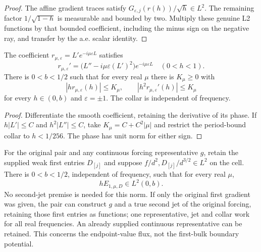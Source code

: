 \begin{proof}
\leanok
The affine gradient traces satisfy $G_{\varepsilon,j}(r(h))/\sqrt h\in L^2$.
The remaining factor $1/\sqrt{1-h}$ is measurable and bounded by two.
Multiply these genuine L2 functions by that bounded coefficient, including
the minus sign on the negative ray, and transfer by the a.e. scalar identity.
\end{proof}

\begin{lemma}
\label{lem:endpoint-coefficient-bounds}
\leanok
The coefficient $r_{\mu,\varepsilon}=L'e^{-i\mu\varepsilon L}$ satisfies
\[
 r_{\mu,\varepsilon}'=
 \bigl(L''-i\mu\varepsilon(L')^2\bigr)e^{-i\mu\varepsilon L}
 \quad(0<h<1).
\]
There is $0<b<1/2$ such that for every real $\mu$ there is $K_\mu\ge0$
with
\[
 |h r_{\mu,\varepsilon}(h)|\le K_\mu,\qquad
 |h^2r_{\mu,\varepsilon}'(h)|\le K_\mu
\]
for every $h\in(0,b)$ and $\varepsilon=\pm1$.
The collar is independent of frequency.
\end{lemma}

\begin{proof}
\leanok
Differentiate the smooth coefficient, retaining the derivative of its phase.
If $h|L'|\le C$ and $h^2|L''|\le C$, take
$K_\mu=C+C^2|\mu|$ and restrict the period-bound collar to $h<1/256$.
The phase has unit norm for either sign.
\end{proof}

\begin{lemma}
\label{lem:weighted-numerator-endpoint-derivative}
\leanok
For the original pair and any continuous forcing representative $g$, retain
the supplied weak first entries $D_{[j]}$ and suppose
$f/d^2,D_{[j]}/d^{3/2}\in L^2$ on the cell.
There is $0<b<1/2$, independent of frequency, such that for every real $\mu$,
\[
 h E_{1,\mu,D}\in L^2(0,b).
\]
No second-jet premise is needed for this norm.
If only the original first gradient was given, the pair can construct $g$
and a true second jet of the original forcing, retaining those first entries
as functions; one representative, jet and collar work for all real frequencies.
An already supplied continuous representative can be retained.
This concerns the endpoint-value flux, not the first-bulk boundary potential.
\end{lemma}

